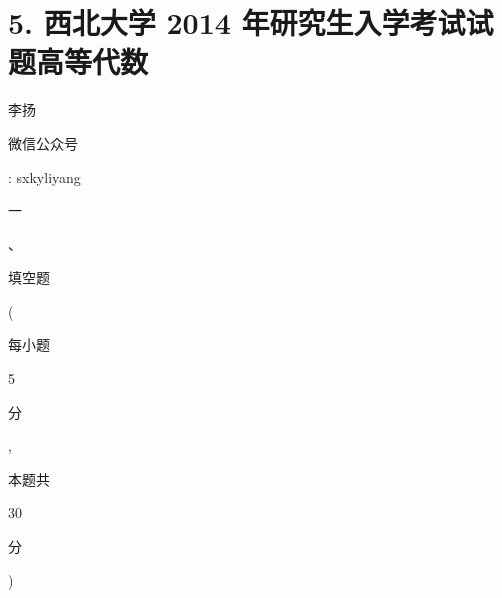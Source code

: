 \documentclass[10pt]{article}
\begin{document}
\section{5. 西北大学 2014 年研究生入学考试试题高等代数}
\begin{CJK}{UTF8}{mj}李扬\end{CJK}

\begin{CJK}{UTF8}{mj}微信公众号\end{CJK}: sxkyliyang

\begin{CJK}{UTF8}{mj}一\end{CJK}、\begin{CJK}{UTF8}{mj}填空题\end{CJK} (\begin{CJK}{UTF8}{mj}每小题\end{CJK} 5 \begin{CJK}{UTF8}{mj}分\end{CJK}, \begin{CJK}{UTF8}{mj}本题共\end{CJK} 30 \begin{CJK}{UTF8}{mj}分\end{CJK})
\end{document}
